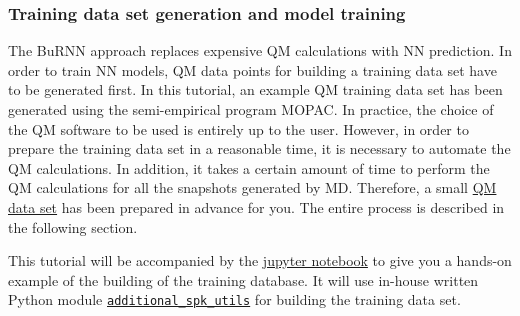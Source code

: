 \subsubsection{Training data set generation and model training}
The BuRNN approach replaces expensive QM calculations with NN prediction. In order to train NN models, QM data points for building a training data set have to be generated first. In this tutorial, an example QM training data set has been generated using the semi-empirical program MOPAC\cite{Stewart1990MOPAC, Stewart2013MOPAC}. In practice, the choice of the QM software to be used is entirely up to the user. However, in order to prepare the training data set in a reasonable time, it is necessary to automate the QM calculations. In addition, it takes a certain amount of time to perform the QM calculations for all the snapshots generated by MD. Therefore, a small \href{https://github.com/LierB/gromos_tutorial_livecoms/tree/burnn_tutorial_rc/tutorial_files/t_06/train_dataset_tutorial/QM_dataset_example}{QM data set} has been prepared in advance for you. The entire process is described in the following section.

This tutorial will be accompanied by the \href{https://github.com/LierB/gromos_tutorial_livecoms/blob/burnn_tutorial_rc/tutorial_files/t_06/train_dataset_tutorial/tutorial_v2.ipynb}{jupyter notebook} to give you a hands-on example of the building of the training database. It will use in-house written Python module \href{https://github.com/LierB/gromos_tutorial_livecoms/blob/burnn_tutorial_rc/tutorial_files/t_06/train_dataset_tutorial/additional_spk_utils.py}{\texttt{additional\_spk\_utils}} for building the training data set.

